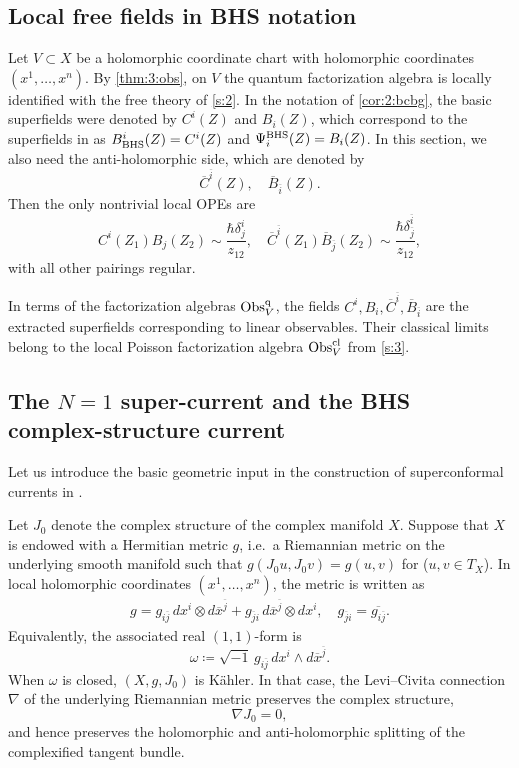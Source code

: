 \documentclass[final,reqno]{amsart}
\numberwithin{equation}{section}
\theoremstyle{definition}
\newcommand{\ol}{\overline}
\newcommand{\ceq}{\coloneqq} %
\newcommand{\BHS}{\textup{BHS}}
\newcommand{\cObs}[1]{\mathop{\Obs^{\textup{cl}}_{#1}}}
\newcommand{\qObs}[1]{\mathop{\Obs^{\textup{q}}_{#1}}}
\DeclareMathOperator{\Obs}{Obs}
\begin{document}
\subsection{Local free fields in BHS notation}\label{ss:4.1}

Let $V \subset X$ be a holomorphic coordinate chart 
with holomorphic coordinates $(x^1,\dotsc,x^n)$. 
By \cref{thm:3:obs}, on $V$ the quantum factorization algebra
is locally identified with the free theory of \cref{s:2}. 
In the notation of \cref{cor:2:bcbg}, 
the basic superfields were denoted by $C^i(Z)$ and $B_i(Z)$,
which correspond to the superfields in \cite{BHS} as
$B^i_{\BHS}(Z)=C^i(Z)$ and $\Psi^{\BHS}_i(Z)=B_i(Z)$.
In this section, we also need the anti-holomorphic side, 
which are denoted by 
\[
 \ol{C}^{\ol{i}}(Z),\quad \ol{B}_{\ol{i}}(Z).
\]
Then the only nontrivial local OPEs are
\begin{equation}\label{eq:4:freeOPE}
 C^i(Z_1)B_j(Z_2) \sim \frac{\hbar \delta^i_j}{z_{12}}, \quad
 \ol{C}^{\ol{i}}(Z_1)\ol{B}_{\ol{j}}(Z_2) \sim
 \frac{\hbar \delta^{\ol{i}}_{\ol{j}}}{z_{12}},
\end{equation}
with all other pairings regular.

In terms of the factorization algebras $\qObs{V}$, 
the fields $C^i,B_i,\ol{C}^{\ol{i}},\ol{B}_{\ol{i}}$ are 
the extracted superfields corresponding to linear observables. 
Their classical limits belong to the local Poisson factorization algebra
$\cObs{V}$ from \cref{s:3}.

\subsection{The $N=1$ super-current and the BHS complex-structure current}
\label{ss:4.2}

Let us introduce the basic geometric input 
in the construction of superconformal currents in \cite{BHS}.

Let $J_0$ denote the complex structure of the complex manifold $X$.
Suppose that $X$ is endowed with a Hermitian metric $g$, 
i.e.\ a Riemannian metric on the underlying smooth manifold such that
$g(J_0u,J_0v)=g(u,v)$ for ($u,v \in T_X$).
In local holomorphic coordinates $(x^1,\dots,x^n)$, the metric is written as
\begin{align*}
 g = g_{i\ol{j}}\,dx^i\otimes d\ol{x}^{\ol{j}} +
     g_{\ol{j}i}\,d\ol{x}^{\ol{j}}\otimes dx^i, \quad
 g_{\ol{j}i} = \ol{g_{i\ol{j}}}.
\end{align*}
Equivalently, the associated real $(1,1)$-form is
\[
 \omega \ceq \sqrt{-1}\,g_{i\ol{j}}\,dx^i\wedge d\ol{x}^{\ol{j}}.
\]
When $\omega$ is closed, $(X,g,J_0)$ is K\"ahler. 
In that case, the Levi--Civita connection $\nabla$ of 
the underlying Riemannian metric preserves the complex structure, 
\[
 \nabla J_0 = 0,
\]
and hence preserves the holomorphic and anti-holomorphic splitting 
of the complexified tangent bundle. 
\end{document}
